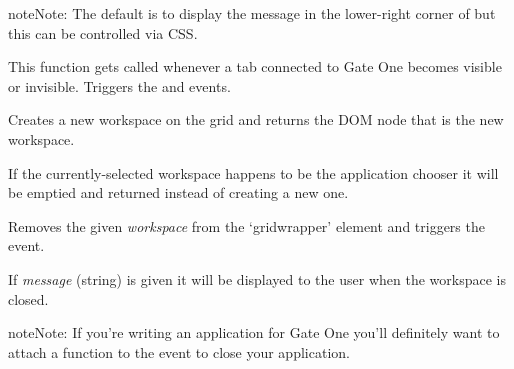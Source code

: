 \documentclass[letterpaper,10pt,openany]{sphinxmanual}
\begin{document}
\begin{fulllineitems}
\begin{fulllineitems}
\begin{fulllineitems}
\begin{notice}{note}{Note:}
The default is to display the message in the lower-right corner of  but this can be controlled via CSS.
\end{notice}

\end{fulllineitems}



\begin{fulllineitems}
\label{Developer/js_gateone:GateOne.Visual.handleVisibility}
This function gets called whenever a tab connected to Gate One becomes visible or invisible.  Triggers the  and  events.

\end{fulllineitems}



\begin{fulllineitems}
\label{Developer/js_gateone:GateOne.Visual.newWorkspace}
Creates a new workspace on the grid and returns the DOM node that is the new workspace.

If the currently-selected workspace happens to be the application chooser it will be emptied and returned instead of creating a new one.

\end{fulllineitems}



\begin{fulllineitems}
\label{Developer/js_gateone:GateOne.Visual.closeWorkspace}
Removes the given \emph{workspace} from the `gridwrapper' element and triggers the  event.

If \emph{message} (string) is given it will be displayed to the user when the workspace is closed.

\begin{notice}{note}{Note:}
If you're writing an application for Gate One you'll definitely want to attach a function to the  event to close your application.
\end{notice}

\end{fulllineitems}




\end{fulllineitems}
\end{fulllineitems}
\end{document}

